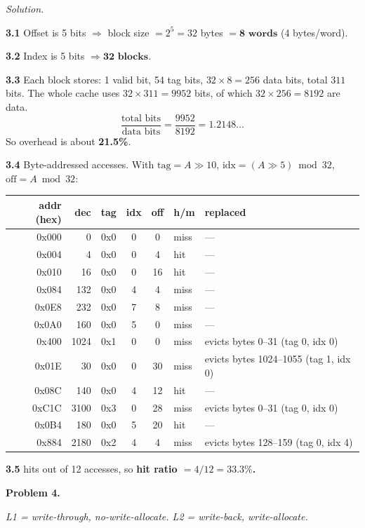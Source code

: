 \documentclass[12pt]{article}
\newcommand{\problem}[1]{\vspace{0.8em}\noindent\textbf{Problem #1.}\vspace{0.35em}}
\newenvironment{solution}{\par\noindent\textit{Solution.}\ }{\par\vspace{1.1em}}
\newcommand{\subproblem}[1]{\par\vspace{0.45em}\noindent\textbf{#1}\quad}
\newcommand{\assigntext}[1]{\par\vspace{0.25em}\small\textit{#1}\par\vspace{0.35em}}
\begin{document}
\begin{solution}
\subproblem{3.1} Offset is 5 bits $\Rightarrow$ block size $= 2^5 = 32$ bytes $= \mathbf{8\text{ words}}$ (4 bytes/word).

\subproblem{3.2} Index is 5 bits $\Rightarrow \mathbf{32\text{ blocks}}$.

\subproblem{3.3} Each block stores: 1 valid bit, 54 tag bits, $32\times 8 = 256$ data bits, total $311$ bits. The whole cache uses $32\times 311 = 9952$ bits, of which $32\times 256 = 8192$ are data.
\[
\frac{\text{total bits}}{\text{data bits}} = \frac{9952}{8192} = 1.2148\ldots
\]
So overhead is about \textbf{21.5\%}.

\subproblem{3.4} Byte-addressed accesses. With $\text{tag}=A{\gg}10$, $\text{idx}=(A{\gg}5)\bmod 32$, $\text{off}=A\bmod 32$:

\begin{center}
\small
\begin{tabular}{@{}rrcccll@{}}
\toprule
addr (hex) & dec & tag & idx & off & h/m & replaced \\
\midrule
0x000 & 0    & 0x0 & 0 & 0  & miss & --- \\
0x004 & 4    & 0x0 & 0 & 4  & hit  & --- \\
0x010 & 16   & 0x0 & 0 & 16 & hit  & --- \\
0x084 & 132  & 0x0 & 4 & 4  & miss & --- \\
0x0E8 & 232  & 0x0 & 7 & 8  & miss & --- \\
0x0A0 & 160  & 0x0 & 5 & 0  & miss & --- \\
0x400 & 1024 & 0x1 & 0 & 0  & miss & evicts bytes 0--31 (tag 0, idx 0) \\
0x01E & 30   & 0x0 & 0 & 30 & miss & evicts bytes 1024--1055 (tag 1, idx 0) \\
0x08C & 140  & 0x0 & 4 & 12 & hit  & --- \\
0xC1C & 3100 & 0x3 & 0 & 28 & miss & evicts bytes 0--31 (tag 0, idx 0) \\
0x0B4 & 180  & 0x0 & 5 & 20 & hit  & --- \\
0x884 & 2180 & 0x2 & 4 & 4  & miss & evicts bytes 128--159 (tag 0, idx 4) \\
\bottomrule
\end{tabular}
\end{center}

\subproblem{3.5} 4 hits out of 12 accesses, so \textbf{hit ratio $= 4/12 = 33.3\%$.}
\end{solution}

\problem{4}
\assigntext{L1 = write-through, no-write-allocate. L2 = write-back, write-allocate.}
\end{document}
